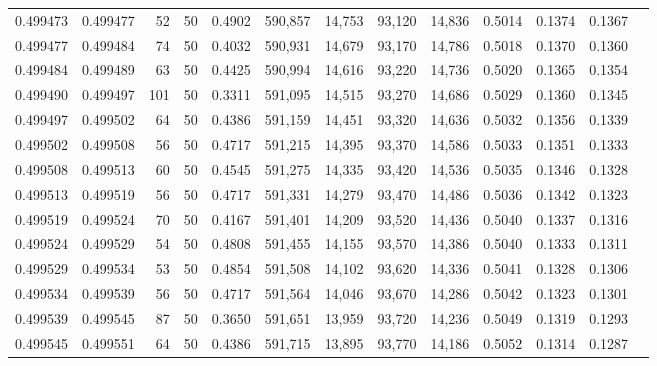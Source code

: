 \begin{tabular}{rrrrrrrrrrrrr}
0.499473 & 0.499477 &    52 &  50 &                                     0.4902 & 590,857 &  14,753 &  93,120 &  14,836 & 0.5014 & 0.1374 & 0.1367 \\
0.499477 & 0.499484 &    74 &  50 &                                     0.4032 & 590,931 &  14,679 &  93,170 &  14,786 & 0.5018 & 0.1370 & 0.1360 \\
0.499484 & 0.499489 &    63 &  50 &                                     0.4425 & 590,994 &  14,616 &  93,220 &  14,736 & 0.5020 & 0.1365 & 0.1354 \\
0.499490 & 0.499497 &   101 &  50 &                                     0.3311 & 591,095 &  14,515 &  93,270 &  14,686 & 0.5029 & 0.1360 & 0.1345 \\
0.499497 & 0.499502 &    64 &  50 &                                     0.4386 & 591,159 &  14,451 &  93,320 &  14,636 & 0.5032 & 0.1356 & 0.1339 \\
0.499502 & 0.499508 &    56 &  50 &                                     0.4717 & 591,215 &  14,395 &  93,370 &  14,586 & 0.5033 & 0.1351 & 0.1333 \\
0.499508 & 0.499513 &    60 &  50 &                                     0.4545 & 591,275 &  14,335 &  93,420 &  14,536 & 0.5035 & 0.1346 & 0.1328 \\
0.499513 & 0.499519 &    56 &  50 &                                     0.4717 & 591,331 &  14,279 &  93,470 &  14,486 & 0.5036 & 0.1342 & 0.1323 \\
0.499519 & 0.499524 &    70 &  50 &                                     0.4167 & 591,401 &  14,209 &  93,520 &  14,436 & 0.5040 & 0.1337 & 0.1316 \\
0.499524 & 0.499529 &    54 &  50 &                                     0.4808 & 591,455 &  14,155 &  93,570 &  14,386 & 0.5040 & 0.1333 & 0.1311 \\
0.499529 & 0.499534 &    53 &  50 &                                     0.4854 & 591,508 &  14,102 &  93,620 &  14,336 & 0.5041 & 0.1328 & 0.1306 \\
0.499534 & 0.499539 &    56 &  50 &                                     0.4717 & 591,564 &  14,046 &  93,670 &  14,286 & 0.5042 & 0.1323 & 0.1301 \\
0.499539 & 0.499545 &    87 &  50 &                                     0.3650 & 591,651 &  13,959 &  93,720 &  14,236 & 0.5049 & 0.1319 & 0.1293 \\
0.499545 & 0.499551 &    64 &  50 &                                     0.4386 & 591,715 &  13,895 &  93,770 &  14,186 & 0.5052 & 0.1314 & 0.1287 \\

\end{tabular}
